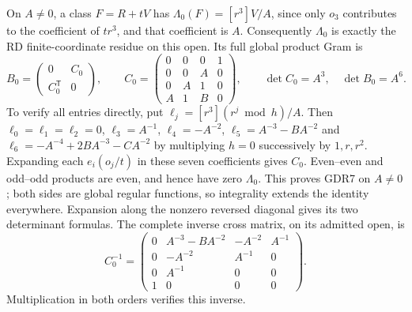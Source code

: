 \documentclass[10pt]{article}
\newcommand{\C}{\mathbb C}
\begin{document}
On $A\ne0$, a class $F=R+tV$ has
$\Lambda_0(F)=[r^3]V/A$, since only $o_3$ contributes to
the coefficient of $tr^3$, and that coefficient is $A$.
Consequently $\Lambda_0$ is exactly the RD finite-coordinate
residue on this open. Its full global product Gram is
\begin{equation}
 B_0=\begin{pmatrix}0&C_0\\C_0^{\mathsf T}&0\end{pmatrix},
 \qquad
 C_0=\begin{pmatrix}
 0&0&0&1\\0&0&A&0\\0&A&1&0\\A&1&B&0
 \end{pmatrix},\qquad
 \det C_0=A^3,\quad\det B_0=A^6.
 \tag{GDR7}
\end{equation}
To verify all entries directly, put
$\ell_j=[r^3](r^j\bmod h)/A$. Then
$\ell_0=\ell_1=\ell_2=0$, $\ell_3=A^{-1}$,
$\ell_4=-A^{-2}$, $\ell_5=A^{-3}-BA^{-2}$ and
$\ell_6=-A^{-4}+2BA^{-3}-CA^{-2}$ by multiplying
$h=0$ successively by $1,r,r^2$. Expanding each
$e_i(o_j/t)$ in these seven coefficients gives $C_0$.
Even--even and odd--odd products are even, and hence have
zero $\Lambda_0$. This proves GDR7 on $A\ne0$; both
sides are global regular functions, so integrality extends
the identity everywhere. Expansion along the nonzero reversed
diagonal gives its two determinant formulas. The complete
inverse cross matrix, on its admitted open, is
\begin{equation}
 C_0^{-1}=
 \begin{pmatrix}
 0&A^{-3}-BA^{-2}&-A^{-2}&A^{-1}\\
 0&-A^{-2}&A^{-1}&0\\0&A^{-1}&0&0\\1&0&0&0
 \end{pmatrix}.
 \tag{GDR8}
\end{equation}
Multiplication in both orders verifies this inverse.
\end{document}

